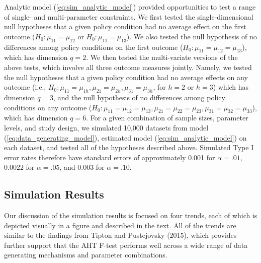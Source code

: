\documentclass[draft]{ectaart}\usepackage[]{graphicx}\usepackage[]{color}
\begin{document}
Analytic model (\ref{eq:sim_analytic_model}) provided opportunities to test a range of single- and multi-parameter constraints. 
We first tested the single-dimensional null hypotheses that a given policy condition had no average effect on the first outcome ($H_0: \mu_{11} = \mu_{12}$ or $H_0: \mu_{11} = \mu_{13}$). 
We also tested the null hypothesis of no differences among policy conditions on the first outcome ($H_0: \mu_{11} = \mu_{12} = \mu_{13}$), which has dimension $q = 2$. 
We then tested the multi-variate versions of the above tests, which involve all three outcome measures jointly. Namely, we tested the null hypotheses that a given policy condition had no average effects on any outcome (i.e., $H_0: \mu_{11} = \mu_{1h}, \mu_{21} = \mu_{2h}, \mu_{31} = \mu_{3h}$, for $h = 2$ or $h = 3$) which has dimension $q = 3$, and the null hypothesis of no differences among policy conditions on any outcome ($H_0: \mu_{11} = \mu_{12} = \mu_{13}, \mu_{21} = \mu_{22} = \mu_{23}, \mu_{31} = \mu_{32} = \mu_{33}$), which has dimension $q = 6$. 
For a given combination of sample sizes, parameter levels, and study design, we simulated 10,000 datasets from model (\ref{eq:data_generating_model}), estimated model (\ref{eq:sim_analytic_model}) on each dataset, and tested all of the hypotheses described above. 
Simulated Type I error rates therefore have standard errors of approximately 0.001 for $\alpha = .01$, 0.0022 for $\alpha = .05$, and 0.003 for $\alpha = .10$. 

\subsection{Simulation Results}

Our discussion of the simulation results is focused on four trends, each of which is depicted visually in a figure and described in the text. 
All of the trends are similar to the findings from Tipton and Pustejovsky (2015), which provides further support that the AHT F-test performs well across a wide range of data generating mechanisms and parameter combinations.
\end{document}
